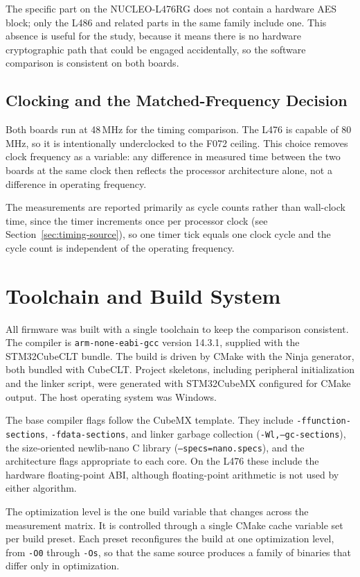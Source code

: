The specific part on the NUCLEO-L476RG does not contain a hardware AES block;
only the L486 and related parts in the same family include one.
This absence is useful for the study, because it means there is no hardware
cryptographic path that could be engaged accidentally, so the software
comparison is consistent on both boards.

\subsection{Clocking and the Matched-Frequency Decision}

Both boards run at 48\,MHz for the timing comparison.
The L476 is capable of 80\,MHz, so it is intentionally underclocked to the
F072 ceiling.
This choice removes clock frequency as a variable: any difference in measured
time between the two boards at the same clock then reflects the processor
architecture alone, not a difference in operating frequency.

The measurements are reported primarily as cycle counts rather than wall-clock
time, since the timer increments once per processor clock (see
Section~\ref{sec:timing-source}), so one timer tick equals one clock cycle and
the cycle count is independent of the operating frequency.

\section{Toolchain and Build System}

All firmware was built with a single toolchain to keep the comparison
consistent.
The compiler is \texttt{arm-none-eabi-gcc} version 14.3.1, supplied with the
STM32CubeCLT bundle.
The build is driven by CMake with the Ninja generator, both bundled with
CubeCLT.
Project skeletons, including peripheral initialization and the linker script,
were generated with STM32CubeMX configured for CMake output.
The host operating system was Windows.

The base compiler flags follow the CubeMX template.
They include \texttt{-ffunction-sections}, \texttt{-fdata-sections}, and linker
garbage collection (\texttt{-Wl,--gc-sections}), the size-oriented newlib-nano
C library (\texttt{--specs=nano.specs}), and the architecture flags appropriate
to each core.
On the L476 these include the hardware floating-point ABI, although
floating-point arithmetic is not used by either algorithm.

The optimization level is the one build variable that changes across the
measurement matrix.
It is controlled through a single CMake cache variable set per build preset.
Each preset reconfigures the build at one optimization level, from \texttt{-O0}
through \texttt{-Os}, so that the same source produces a family of binaries
that differ only in optimization.

